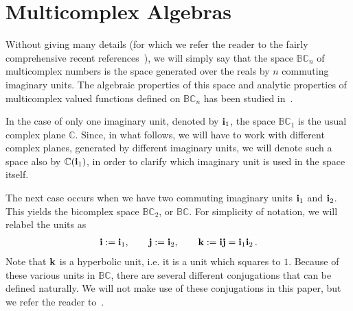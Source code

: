 \documentclass[reqno]{amsart}
\theoremstyle{plain}
\theoremstyle{definition}
\theoremstyle{remark}
\numberwithin{equation}{section}
\begin{document}
\bigskip

\section{Multicomplex Algebras}
\label{sec:multicomplex_algebras}

Without giving many details (for which we refer the reader to the
fairly comprehensive recent
references~\cite{bicomplex2,bicomplexbook,price,bicomplex3,bicomplex4}),
we will simply say that the space ${{\mathbb B}{\mathbb C}}_n$ of multicomplex numbers is
the space generated over the reals by $n$ commuting imaginary
units. The algebraic properties of this space and analytic properties
of multicomplex valued functions defined on ${{\mathbb B}{\mathbb C}}_n$ has been studied
in~\cite{bicomplex4}.

In the case of only one imaginary unit, denoted by ${{\bf i}}_1$, the space
${{\mathbb B}{\mathbb C}}_1$ is the usual complex plane ${{\mathbb C}}$. Since, in what follows, we
will have to work with different complex planes, generated by
different imaginary units, we will denote such a space also by
${{\mathbb C}}({{\bf i}}_1)$, in order to clarify which imaginary unit is used in the
space itself.

The next case occurs when we have two commuting imaginary units ${{\bf i}}_1$
and ${{\bf i}}_2$. This yields the bicomplex space ${{\mathbb B}{\mathbb C}}_2$, or ${{\mathbb B}{\mathbb C}}$.  For
simplicity of notation, we will relabel the units as
\begin{align*}
  {{\bf i}} := {{\bf i}}_1,\qquad {{\bf j}}:= {{\bf i}}_2,\qquad {{\bf k}} := {{\bf i}}{{\bf j}} = {{\bf i}}_1{{\bf i}}_2\,.
\end{align*}
Note that ${{\bf k}}$ is a hyperbolic unit, i.e. it is a unit which squares
to $1$.  Because of these various units in ${{\mathbb B}{\mathbb C}}$, there are several
different conjugations that can be defined naturally. We will not make
use of these conjugations in this paper, but we refer the reader
to~\cite{bicomplexbook}.

\medskip
\end{document}
